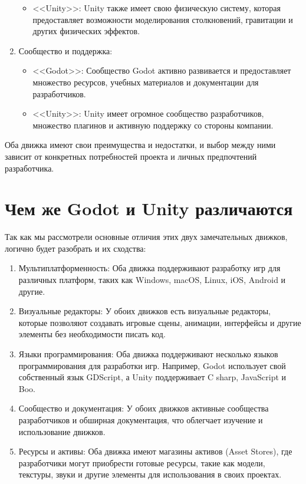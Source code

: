 \begin{enumerate}
\begin{itemize}
        \item <<Unity>>: Unity также имеет свою физическую систему, которая предоставляет возможности моделирования столкновений, гравитации и других физических эффектов.
    \end{itemize}
\item Сообщество и поддержка:
    \begin{itemize}
        \item <<Godot>>: Сообщество Godot активно развивается и предоставляет множество ресурсов, учебных материалов и документации для разработчиков.
        \item <<Unity>>: Unity имеет огромное сообщество разработчиков, множество плагинов и активную поддержку со стороны компании.
    \end{itemize}
\end{enumerate}
Оба движка имеют свои преимущества и недостатки, и выбор между ними зависит от конкретных потребностей проекта и личных предпочтений разработчика.


\section{\label{sec:ch01/sec02}Чем же Godot и Unity различаются}
Так как мы рассмотрели основные отличия этих двух замечательных движков, логично будет разобрать и их сходства:
\begin{enumerate}
    \item  Мультиплатформенность: Оба движка поддерживают разработку игр для различных платформ, таких как Windows, macOS, Linux, iOS, Android и другие.
    \item Визуальные редакторы:  У обоих движков есть визуальные редакторы, которые позволяют создавать игровые сцены, анимации, интерфейсы и другие элементы без необходимости писать код.
    \item Языки программирования: Оба движка поддерживают несколько языков программирования для разработки игр. Например, Godot использует свой собственный язык GDScript, а Unity поддерживает C sharp, JavaScript и Boo.
    \item Сообщество и документация: У обоих движков активные сообщества разработчиков и обширная документация, что облегчает изучение и использование движков.
    \item Ресурсы и активы: Оба движка имеют магазины активов (Asset Stores), где разработчики могут приобрести готовые ресурсы, такие как модели, текстуры, звуки и другие элементы для использования в своих проектах.
\end{enumerate}


